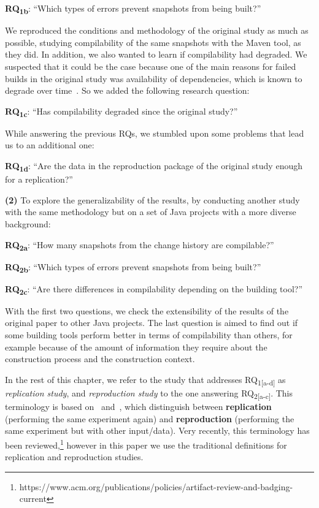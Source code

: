 \textbf{RQ\textsubscript{1b}}: ``Which types of errors prevent snapshots from being built?''

We reproduced the conditions and methodology of the original study as much as possible, studying compilability of the same snapshots with the Maven tool, as they did. 
In addition, we also wanted to learn if compilability had degraded. We suspected that it could be the case because one of the main reasons for failed builds in the original study was availability of dependencies, which is known to degrade over time~\cite{bavota2015apache}. So we added the following research question:

\textbf{RQ\textsubscript{1c}}: ``Has compilability degraded since the original study?''

While answering the previous RQs, we stumbled upon some problems that lead us to an additional one:

\textbf{RQ\textsubscript{1d}}: ``Are the data in the reproduction package of the original study enough for a replication?''

\textbf{(2)} To explore the generalizability of the results, by conducting another study with the same methodology but on a  set of Java projects with a more diverse background:

\textbf{RQ\textsubscript{2a}}: ``How many snapshots from the change history are compilable?''

\textbf{RQ\textsubscript{2b}}: ``Which types of errors prevent snapshots from being built?''

\textbf{RQ\textsubscript{2c}}: ``Are there differences in compilability depending on the building tool?''

With the first two questions, we check the extensibility of the results of the original paper to other Java projects. 
The last question is aimed to find out if some building tools perform better in terms of compilability than others, for example because of the amount of information they require about the construction process and the construction context.

In the rest of this chapter, we refer to the study that addresses RQ\textsubscript{1[a-d]} as \emph{replication study}, and \emph{reproduction study} to the one answering RQ\textsubscript{2[a-c]}. 
This terminology is based on~\cite{juristo2010replication} and~\cite{cartwright1991replicability}, which distinguish between \textbf{replication} (performing the same experiment again) and \textbf{reproduction} (performing the same experiment but with other input/data). Very recently, this terminology has been reviewed,\footnote{https://www.acm.org/publications/policies/artifact-review-and-badging-current} however in this paper we use the traditional definitions for replication and reproduction studies.

